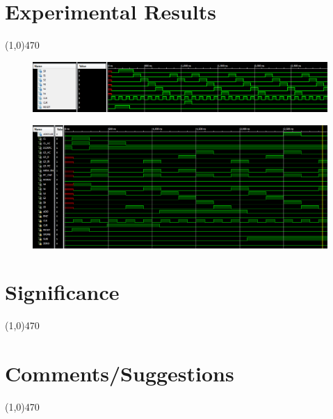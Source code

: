 \documentclass[12pt]{article}
\begin{document}
			
\section{Experimental Results}\vspace{-.7cm} \line(1,0){470}

\begin{figure}[h][h]
    \centering
	\includegraphics[scale=.48]{control_tb.png}
	\caption{}
\end{figure}

\begin{figure}[h][h]
    \centering
	\includegraphics[scale=.48]{controller_tb.png}
	\caption{}
\end{figure}


	\newpage
\section{Significance} \vspace{-.7cm} \line(1,0){470}
	\paragraph{}


 \section{Comments/Suggestions}\vspace{-.7cm} \line(1,0){470}
 	\paragraph{}
		
\end{document}
